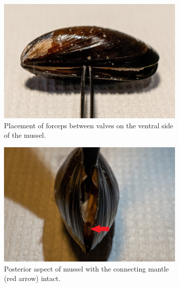 \begin{figure}
    \centering
    \begin{subfigure}[b]{.45\textwidth}
        \centering
        \includegraphics[width=\textwidth]{figures/Sampling technique/forceps square color.jpg}
        \caption{Placement of forceps between valves on the ventral side of the mussel.}
        \label{sfig:a}
    \end{subfigure}
    \hfill
    \begin{subfigure}[b]{.45\textwidth}
        \centering
        \includegraphics[width=\textwidth]{figures/Sampling technique/uncut color 3495.jpg}
        \caption{Posterior aspect of mussel with the connecting mantle (red arrow) intact.}
        \label{sfig:b}
    \end{subfigure}
    \newline
    \begin{subfigure}[b]{.45\textwidth}

\end{subfigure}
\end{figure}
